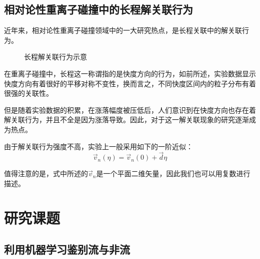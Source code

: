 \documentclass[aps,pre,12pt,preprint,onecolumn,showpacs,showkeys]{revtex4-1}
\begin{document}
\subsection{相对论性重离子碰撞中的长程解关联行为}
近年来，相对论性重离子碰撞领域中的一大研究热点，是长程关联中的解关联行为\cite{PhysRevC.95.064914}。
\begin{figure}[htbp]
    \centering
    \caption{长程解关联行为示意\label{fig:de}}%
    \end{figure}\par
在重离子碰撞中，长程这一称谓指的是快度方向的行为，如前所述，实验数据显示快度方向有着很好的平移对称不变性，换而言之，不同快度区间内的粒子分布有着很强的关联性。\par
但是随着实验数据的积累，在涨落幅度被压低后，人们意识到在快度方向也存在着解关联行为，并且不全是因为涨落导致。因此，对于这一解关联现象的研究逐渐成为热点。\par
由于解关联行为强度不高，实验上一般采用如下的一阶近似：
\begin{equation}
    \vec{v}_n(\eta)=\vec{v}_n(0)+\vec{d}\eta\label{eq:decorr}
\end{equation}
\par
值得注意的是，式中所述的$\vec{v}_n$是一个平面二维矢量，因此我们也可以用复数进行描述。
\section{研究课题}
\subsection{利用机器学习鉴别流与非流}
\end{document}
